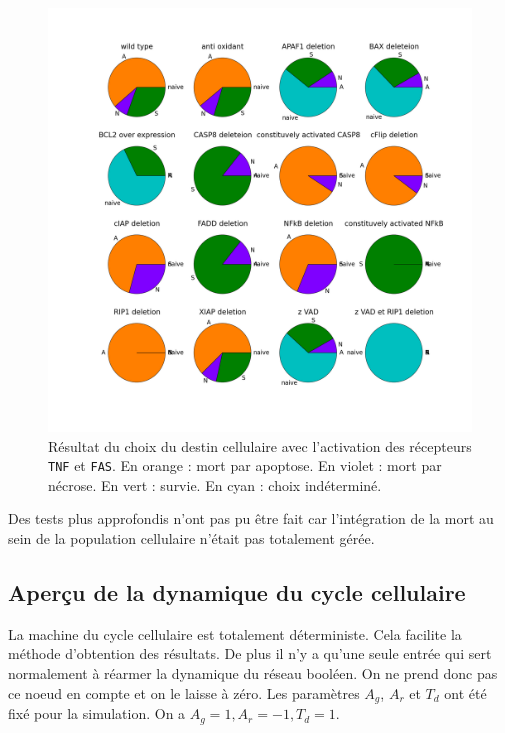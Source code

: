 \documentclass[11pt, a4paper]{article}
\begin{document}
\begin{figure}[position]
    \begin{center}
        \includegraphics[scale=0.25]{tnf1_fas1}
        \caption{
            \label{tnf1_fas1}
            Résultat du choix du destin cellulaire avec l'activation des
            récepteurs \texttt{TNF} et \texttt{FAS}. En orange : mort par
            apoptose. En violet : mort par nécrose. En vert : survie. En cyan :
            choix indéterminé.
        }
    \end{center}
\end{figure}

Des tests plus approfondis n'ont pas pu être fait car l'intégration de la mort
au sein de la population cellulaire n'était pas totalement gérée.

\subsection{Aperçu de la dynamique du cycle cellulaire}
La machine du cycle cellulaire est totalement déterministe. Cela facilite la
méthode d'obtention des résultats. De plus il n'y a qu'une seule entrée qui
sert normalement à réarmer la dynamique du réseau booléen. On ne prend donc pas
ce noeud en compte et on le laisse à zéro. Les paramètres $A_g$, $A_r$ et $T_d$
ont été fixé pour la simulation. On a $A_g = 1, A_r = -1, T_d = 1$.
\end{document}
